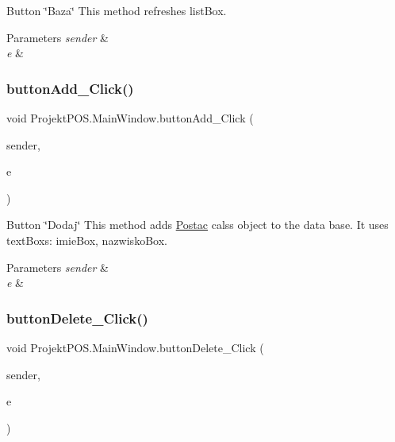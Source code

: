 Button \char`\"{}\+Baza\char`\"{} This method refreshes list\+Box. 


\begin{DoxyParams}{Parameters}
{\em sender} & \\
\hline
{\em e} & \\
\hline
\end{DoxyParams}
\mbox{\label{class_projekt_p_o_s_1_1_main_window_a0f8ea018177f274247e6d4601fb9e76e}} 
\subsubsection{\texorpdfstring{button\+Add\+\_\+\+Click()}{buttonAdd\_Click()}}
{\footnotesize\ttfamily void Projekt\+P\+O\+S.\+Main\+Window.\+button\+Add\+\_\+\+Click (\begin{DoxyParamCaption}\item[{object}]{sender,  }\item[{Routed\+Event\+Args}]{e }\end{DoxyParamCaption})\hspace{0.3cm}{\ttfamily [private]}}



Button \char`\"{}\+Dodaj\char`\"{} This method adds \hyperlink{class_projekt_p_o_s_1_1_postac}{Postac} calss object to the data base. It uses text\+Boxs\+: imie\+Box, nazwisko\+Box. 


\begin{DoxyParams}{Parameters}
{\em sender} & \\
\hline
{\em e} & \\
\hline
\end{DoxyParams}
\mbox{\label{class_projekt_p_o_s_1_1_main_window_ac955d8aa2cc3dceeafa88d532c69a5e3}} 
\subsubsection{\texorpdfstring{button\+Delete\+\_\+\+Click()}{buttonDelete\_Click()}}
{\footnotesize\ttfamily void Projekt\+P\+O\+S.\+Main\+Window.\+button\+Delete\+\_\+\+Click (\begin{DoxyParamCaption}\item[{object}]{sender,  }\item[{Routed\+Event\+Args}]{e }\end{DoxyParamCaption})\hspace{0.3cm}{\ttfamily [private]}}



